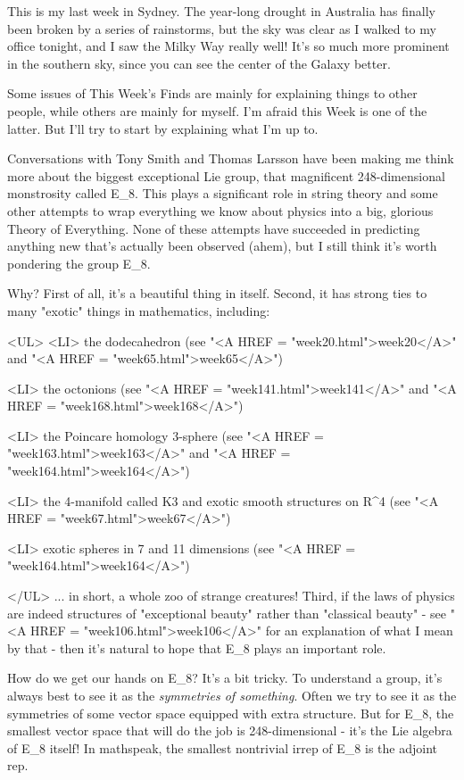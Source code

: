 



This is my last week in Sydney.  The year-long drought in Australia 
has finally been broken by a series of rainstorms, but the sky was 
clear as I walked to my office tonight, and I saw the Milky Way really 
well!  It's so much more prominent in the southern sky, since you can 
see the center of the Galaxy better.

Some issues of This Week's Finds are mainly for explaining things
to other people, while others are mainly for myself.  I'm afraid this 
Week is one of the latter.  But I'll try to start by explaining what 
I'm up to.

Conversations with Tony Smith and Thomas Larsson have been making me
think more about the biggest exceptional Lie group, that magnificent
248-dimensional monstrosity called E_{8}.  This plays a significant role in
string theory and some other attempts to wrap everything we know about
physics into a big, glorious Theory of Everything.  None of these
attempts have succeeded in predicting anything new that's actually
been observed (ahem), but I still think it's worth pondering the group E_{8}.

Why?  First of all, it's a beautiful thing in itself.  Second, it has
strong ties to many "exotic" things in mathematics, including:

<UL>
<LI>
 the dodecahedron (see "<A HREF = "week20.html">week20</A>" and "<A HREF = "week65.html">week65</A>")

<LI>
 the octonions (see "<A HREF = "week141.html">week141</A>" and "<A HREF = "week168.html">week168</A>")

<LI>
 the Poincare homology 3-sphere (see "<A HREF = "week163.html">week163</A>" and "<A HREF = "week164.html">week164</A>")

<LI>
 the 4-manifold called K3 and exotic smooth structures on R^{4} 
(see "<A HREF = "week67.html">week67</A>")

<LI>
 exotic spheres in 7 and 11 dimensions (see "<A HREF = "week164.html">week164</A>")

</UL>
... in short, a whole zoo of strange creatures!  Third, if the laws of 
physics are indeed structures of "exceptional beauty" rather than 
"classical beauty" - see "<A HREF = "week106.html">week106</A>" for an explanation of what I mean 
by that - then it's natural to hope that E_{8} plays an important role.

How do we get our hands on E_{8}?  It's a bit tricky.  To understand a
group, it's always best to see it as the \emph{symmetries of something}.
Often we try to see it as the symmetries of some vector space equipped
with extra structure.  But for E_{8}, the smallest vector space that will
do the job is 248-dimensional - it's the Lie algebra of E_{8} itself!  In
mathspeak, the smallest nontrivial irrep of E_{8} is the adjoint rep.  


